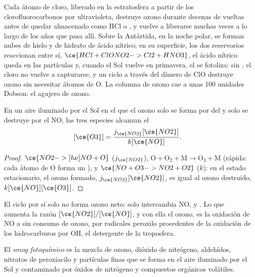 Cada átomo de cloro, liberado en la estratosfera a partir de los clorofluorocarbonos por
 ultravioleta, destruye ozono durante decenas de vueltas antes de quedar almacenado como
HCl o , y vuelve a liberarse muchas veces a lo largo de los años que pasa
allí. Sobre la Antártida, en la noche polar, se forman nubes de hielo y de hidrato de ácido
nítrico; en su superficie, los dos reservorios reaccionan entre sí,
$\ce{HCl + ClONO2 -> Cl2 + HNO3}$, el ácido nítrico queda en las partículas y, cuando el
Sol vuelve en primavera, el  se fotoliza: sin , el cloro no vuelve a
capturarse, y un ciclo a través del dímero de ClO destruye ozono sin
necesitar átomos de O. La columna de ozono cae a unas 100 unidades Dobson: el agujero
de ozono.

\begin{proposition}\label{prop:b3:photochemistry:leighton}
En un aire iluminado por el Sol en el que el ozono solo se forma por  del  y solo se destruye
por el NO, las tres especies alcanzan el 
\[
  [\ce{O3}] = \frac{j_{\ce{NO2}}[\ce{NO2}]}{k[\ce{NO}]} .
\]
\end{proposition}

\begin{proof}
$\ce{NO2 ->[h\nu] NO + O}$ ($j_{\ce{NO2}}$), $\mathrm{O + O_2 + M \to O_3 + M}$ (rápida: cada átomo de O forma un ), y
$\ce{NO + O3 -> NO2 + O2}$ ($k$): en el estado estacionario, el ozono formado, $j_{\ce{NO2}}[\ce{NO2}]$, es igual al
ozono destruido, $k[\ce{NO}][\ce{O3}]$.
\end{proof}

El ciclo por sí solo no forma ozono neto: solo intercambia NO,  y . Lo que
aumenta la razón $[\ce{NO2}]/[\ce{NO}]$, y con ella el ozono, es la oxidación de NO a 
sin consumo de ozono, por radicales peroxilo procedentes de la oxidación de los
hidrocarburos por OH, el detergente de la troposfera.

\begin{definition}\label{def:b3:photochemistry:smog}
El \emph{smog fotoquímico} es la mezcla de ozono,
dióxido de nitrógeno, aldehídos, nitratos de peroxiacilo y partículas finas que se forma en el
aire iluminado por el Sol y contaminado por óxidos de nitrógeno y compuestos orgánicos volátiles.
\end{definition}

